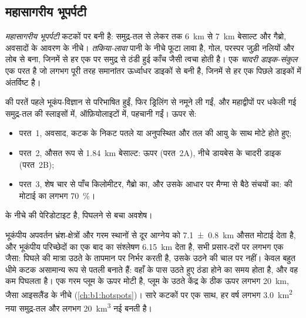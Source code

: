 \subsection*{महासागरीय भूपर्पटी}

\begin{definition}[महासागरीय भूपर्पटी, तकिया-लावा, चादरी डाइक-संकुल]\label{def:b1:rifts-ridges-margins:oceanic-crust}
\emph{महासागरीय भूपर्पटी} कटकों पर बनी  है: समुद्र-तल से लेकर  तक \qty{6}{km} से \qty{7}{km} बेसाल्ट और गैब्रो, अवसादों के आवरण के नीचे। \emph{तकिया-लावा} पानी के नीचे फूटा लावा है, गोल, परस्पर जुड़ी नलियों और लोब से बना, जिनमें से हर एक पर समुद्र से ठंडी हुई काँच जैसी त्वचा होती है। एक \emph{चादरी डाइक-संकुल} एक परत है जो लगभग पूरी तरह समानांतर ऊर्ध्वाधर डाइकों से बनी है, जिनमें से हर एक पिछले डाइकों में अंतर्विष्ट है।
\end{definition}

 की परतें पहले भूकंप-विज्ञान से परिभाषित हुईं, फिर ड्रिलिंग से नमूने ली गईं, और महाद्वीपों पर धकेली गई समुद्र-तल की स्लाइसों में, ऑफ़ियोलाइटों में, पहचानी गईं। ऊपर से:
\begin{itemize}
  \item परत~1, अवसाद, कटक के निकट पतले या अनुपस्थित और तल की आयु के साथ मोटे होते हुए;
  \item परत~2, औसत रूप से \qty{1.84}{km} बेसाल्ट: ऊपर  (परत~2A), नीचे डायबेस के चादरी डाइक (परत~2B);
  \item परत~3, शेष चार से पाँच किलोमीटर, गैब्रो का, और उसके आधार पर मैग्मा से बैठे संचयों का:  की मोटाई का लगभग \qty{70}{\percent}।
\end{itemize}
 के नीचे  की पेरिडोटाइट है, पिघलने से बचा अवशेष।

भूकंपीय अपवर्तन भ्रंश-क्षेत्रों और गरम स्थानों से दूर आग्नेय  को \qty[uncertainty-mode=separate]{7.1 \pm 0.8}{km} औसत मोटाई देता है, और भूकंपीय परिच्छेदों का एक बाद का संश्लेषण \qty{6.15}{km} देता है, सभी प्रसार-दरों पर लगभग एक जैसा: पिघले की मात्रा उठते  के तापमान पर निर्भर करती है, उसके उठने की चाल पर नहीं। केवल बहुत धीमे कटक असामान्य रूप से पतली  बनाते हैं: वहाँ  के पास उठते हुए ठंडा होने का समय होता है, और वह कम पिघलता है। एक गरम प्लूम के ऊपर  मोटी है, प्लूम के उठते केंद्र के ठीक ऊपर लगभग \qty{20}{km}, जैसा आइसलैंड के नीचे (\cref{ch:b1:hotspots})। सारे कटकों पर एक साथ, हर वर्ष लगभग \qty{3.0}{km^2} नया समुद्र-तल और लगभग \qty{20}{km^3} नई  बनती है।

